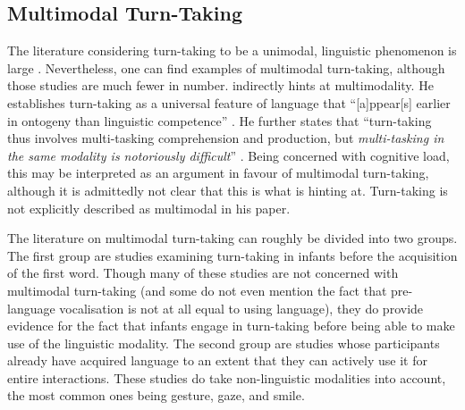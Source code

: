 \subsection{Multimodal Turn-Taking}
\label{ssec:introrestt}
The literature considering turn-taking to be a unimodal, linguistic phenomenon is large \citep[to name but a few recent examples]{casillas_turn-taking_2016,freud_turn-taking_2016,heldner_pauses_2010,kurtic_resources_2013}.
Nevertheless, one can find examples of multimodal turn-taking, although those studies are much fewer in number.
\citet{levinson_turn-taking_2016} indirectly hints at multimodality.
He establishes turn-taking as a universal feature of language that ``[a]ppear[s] earlier in ontogeny than linguistic competence'' \citep[]{levinson_turn-taking_2016}.
He further states that ``turn-taking thus involves multi-tasking comprehension and production, but \emph{multi-tasking in the same modality is notoriously difficult}'' \citep[, emphasis mine]{levinson_turn-taking_2016}.
Being concerned with cognitive load, this may be interpreted as an argument in favour of multimodal turn-taking, although it is admittedly not clear that this is what \citeauthor{levinson_turn-taking_2016} is hinting at.
Turn-taking is not explicitly described as multimodal in his paper.

The literature on multimodal turn-taking can roughly be divided into two groups.
The first group are studies examining turn-taking in infants before the acquisition of the first word.
Though many of these studies are not concerned with multimodal turn-taking (and some do not even mention the fact that pre-language vocalisation is not at all equal to using language), they do provide evidence for the fact that infants engage in turn-taking before being able to make use of the linguistic modality.
The second group are studies whose participants already have acquired language to an extent that they can actively use it for entire interactions.
These studies do take non-linguistic modalities into account, the most common ones being gesture, gaze, and smile. %

